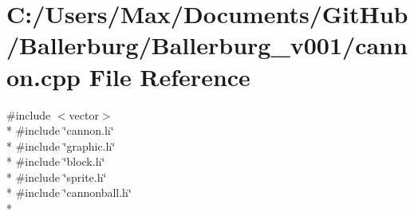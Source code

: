 \section{C\+:/\+Users/\+Max/\+Documents/\+Git\+Hub/\+Ballerburg/\+Ballerburg\+\_\+v001/cannon.cpp File Reference}
\label{cannon_8cpp}
{\ttfamily \#include $<$vector$>$}\\*
{\ttfamily \#include \char`\"{}cannon.\+h\char`\"{}}\\*
{\ttfamily \#include \char`\"{}graphic.\+h\char`\"{}}\\*
{\ttfamily \#include \char`\"{}block.\+h\char`\"{}}\\*
{\ttfamily \#include \char`\"{}sprite.\+h\char`\"{}}\\*
{\ttfamily \#include \char`\"{}cannonball.\+h\char`\"{}}\\*
